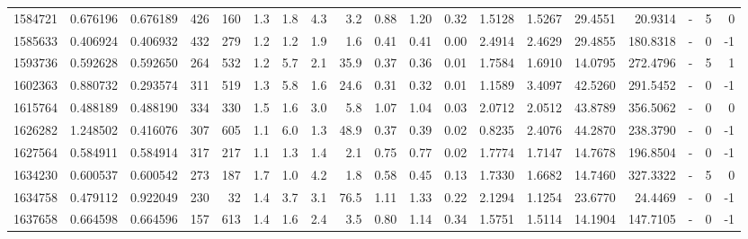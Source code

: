 \begin{tabular}{rrrrrrrrrrrrrrrrlrr}
   1584721 & 0.676196 &   0.676189 &  426 &  160 &      1.3 &      1.8 &     4.3 &      3.2 &       0.88 &        1.20 &        0.32 &  1.5128 &  1.5267 &   29.4551 &   20.9314 &             - &        5 &          0 \\
   1585633 & 0.406924 &   0.406932 &  432 &  279 &      1.2 &      1.2 &     1.9 &      1.6 &       0.41 &        0.41 &        0.00 &  2.4914 &  2.4629 &   29.4855 &  180.8318 &             - &        0 &         -1 \\
   1593736 & 0.592628 &   0.592650 &  264 &  532 &      1.2 &      5.7 &     2.1 &     35.9 &       0.37 &        0.36 &        0.01 &  1.7584 &  1.6910 &   14.0795 &  272.4796 &             - &        5 &          1 \\
   1602363 & 0.880732 &   0.293574 &  311 &  519 &      1.3 &      5.8 &     1.6 &     24.6 &       0.31 &        0.32 &        0.01 &  1.1589 &  3.4097 &   42.5260 &  291.5452 &             - &        0 &         -1 \\
   1615764 & 0.488189 &   0.488190 &  334 &  330 &      1.5 &      1.6 &     3.0 &      5.8 &       1.07 &        1.04 &        0.03 &  2.0712 &  2.0512 &   43.8789 &  356.5062 &             - &        0 &          0 \\
   1626282 & 1.248502 &   0.416076 &  307 &  605 &      1.1 &      6.0 &     1.3 &     48.9 &       0.37 &        0.39 &        0.02 &  0.8235 &  2.4076 &   44.2870 &  238.3790 &             - &        0 &         -1 \\
   1627564 & 0.584911 &   0.584914 &  317 &  217 &      1.1 &      1.3 &     1.4 &      2.1 &       0.75 &        0.77 &        0.02 &  1.7774 &  1.7147 &   14.7678 &  196.8504 &             - &        0 &         -1 \\
   1634230 & 0.600537 &   0.600542 &  273 &  187 &      1.7 &      1.0 &     4.2 &      1.8 &       0.58 &        0.45 &        0.13 &  1.7330 &  1.6682 &   14.7460 &  327.3322 &             - &        5 &          0 \\
   1634758 & 0.479112 &   0.922049 &  230 &   32 &      1.4 &      3.7 &     3.1 &     76.5 &       1.11 &        1.33 &        0.22 &  2.1294 &  1.1254 &   23.6770 &   24.4469 &             - &        0 &         -1 \\
   1637658 & 0.664598 &   0.664596 &  157 &  613 &      1.4 &      1.6 &     2.4 &      3.5 &       0.80 &        1.14 &        0.34 &  1.5751 &  1.5114 &   14.1904 &  147.7105 &             - &        0 &         -1 \\

\end{tabular}
